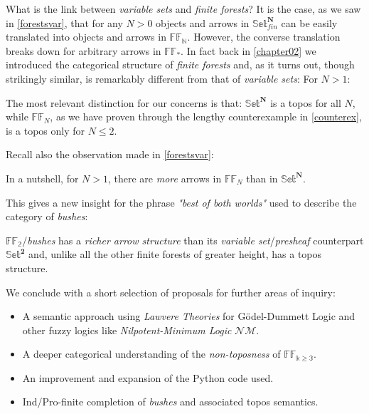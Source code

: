 What is the link between \emph{variable sets} and \emph{finite forests}?\newline\newline
It is the case, as we saw in \ref{forestsvar},  that for any $N>0$ objects and arrows in $\mathbb{Set}_{fin}^{\textbf{N}}$ can be easily translated into objects and arrows in $\mathbb{FF_N}$.\newline
However, the converse translation breaks down for arbitrary arrows in $\mathbb{FF}_*$.\newline
In fact back in \ref{chapter02} we introduced the categorical structure of \emph{finite forests} and, as it turns out, though strikingly similar, is remarkably different from that of \emph{variable sets}:
For $N>1$:
\begin{remark}
	The most relevant distinction for our concerns is that: $\mathbb{Set}^\textbf{N}$ is a topos for all $N$, while $\mathbb{FF}_N$, as we have proven through the lengthy counterexample in \ref{counterex},  is a topos only for $N \leq 2$.
\end{remark}

Recall also the observation made in \ref{forestsvar}: 

\begin{remark}
	In a nutshell, for $N > 1$, there are \emph{more} arrows in $\mathbb{FF}_N$ than in $\mathbb{Set}^\textbf{N}$.	
\end{remark}

This gives a new insight for the phrase \emph{"best of both worlds"} used to describe the category of \emph{bushes}:

\begin{remark}
	$\mathbb{FF_2}$/\emph{bushes} has a \emph{richer arrow structure} than its \emph{variable set}/\emph{presheaf} counterpart $\mathbb{Set}^{\textbf{2}}$ and, unlike all the other finite forests of greater height, has a topos structure.
\end{remark}

We conclude with a short selection of proposals for
further areas of inquiry:
\begin{itemize}
	\item A semantic approach using \emph{Lawvere Theories} for Gödel-Dummett Logic and other fuzzy logics like \emph{Nilpotent-Minimum Logic} $\mathcal{NM}$.
	\item A deeper categorical understanding of the \emph{non-toposness} of $\mathbb{FF_{k\geq3}}$.
	\item An improvement and expansion of the Python code used.
	\item Ind/Pro-finite completion of \emph{bushes} and associated topos semantics.
\end{itemize}

